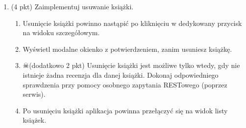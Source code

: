\documentclass[12pt]{article}
\begin{document}
\begin{enumerate}
		\item
			(4 pkt) Zaimplementuj usuwanie książki. 
			\begin{enumerate}
				\item Usunięcie książki powinno nastąpić po kliknięciu w dedykowany przycisk na widoku szczegółowym.
				\item Wyświetl modalne okienko z potwierdzeniem, zanim usuniesz książkę.
				\item $\skull$(dodatkowo 2 pkt) Usunięcie książki jest możliwe tylko wtedy, gdy nie istnieje żadna recenzja dla danej książki. Dokonaj odpowiedniego sprawdzenia przy pomocy osobnego zapytania RESTowego (poprzez serwis).
				\item Po usunięciu książki aplikacja powinna przełączyć się na widok listy książek.
			\end{enumerate}

    \end{enumerate}
\end{document}
